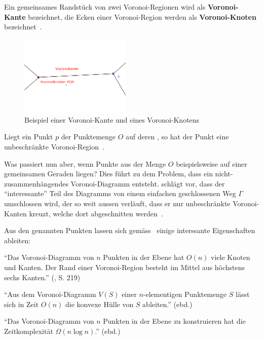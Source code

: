 \newpage{}

Ein gemeinsames Randstück von zwei Voronoi-Regionen wird als \textbf{Voronoi-Kante} bezeichnet, die Ecken einer Voronoi-Region werden als \textbf{Voronoi-Knoten} bezeichnet~\parencite[S. 213]{klein2005algorithmischegeometrie}.

\begin{figure}[h]
\centering
\includegraphics[width=200px]{images/voronoi_kante_knoten.png}
\caption{Beispiel einer Voronoi-Kante und eines Voronoi-Knotens\protect\footnotemark}
\label{fig:voronoiEdgeKnot}
\end{figure}

Liegt ein Punkt $p$ der Punktemenge $O$ auf deren , so hat der Punkt eine unbeschränkte Voronoi-Region~\parencite[S. 217]{klein2005algorithmischegeometrie}.

Was passiert nun aber, wenn Punkte aus der Menge $O$ beispielsweise auf einer gemeinsamen Geraden liegen? Dies führt zu dem Problem, dass ein nicht-zusammenhängendes Voronoi-Diagramm entsteht. \citeauthor{klein2005algorithmischegeometrie} schlägt vor, dass der ``interessante'' Teil des Diagramms von einem einfachen geschlossenen Weg $\Gamma$ umschlossen wird, der so weit aussen verläuft, dass er nur unbeschränkte Voronoi-Kanten kreuzt, welche dort abgeschnitten werden~\parencite[S. 217]{klein2005algorithmischegeometrie}.

Aus den genannten Punkten lassen sich gemäss~\citeauthor{klein2005algorithmischegeometrie} einige interssante Eigenschaften ableiten:
\begin{compactitem}
\item ``Das Voronoi-Diagramm von $n$ Punkten in der Ebene hat $O(n)$ viele Knoten und Kanten. Der Rand einer Voronoi-Region besteht im Mittel aus höchstens sechs Kanten.'' (\citeyear{klein2005algorithmischegeometrie}, S. 219)
\item ``Aus dem Voronoi-Diagramm $V(S)$ einer $n$-elementigen Punktemenge $S$ lässt sich in Zeit $O(n)$ die konvexe Hülle von $S$ ableiten.'' (ebd.)
\item ``Das Voronoi-Diagramm von $n$ Punkten in der Ebene zu konstruieren hat die Zeitkomplexität $\Omega(n \log{n})$.'' (ebd.)
\end{compactitem}

